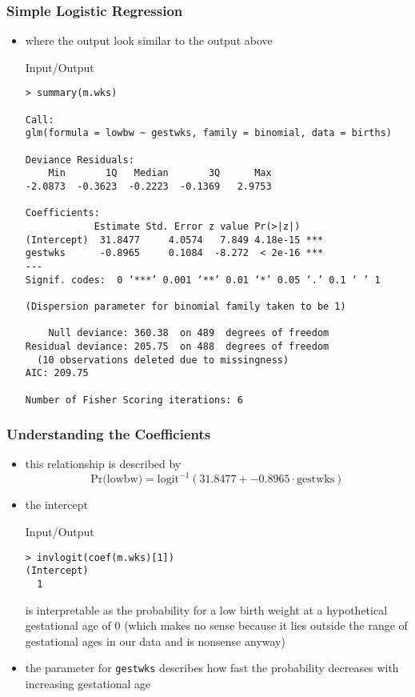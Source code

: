\begin{frame}[fragile]\frametitle{Simple Logistic Regression}
\begin{itemize}
\item where the output look similar to the output above
  \begin{exampleblock}{Input/Output}\scriptsize
\begin{verbatim}
> summary(m.wks)

Call:
glm(formula = lowbw ~ gestwks, family = binomial, data = births)

Deviance Residuals: 
    Min       1Q   Median       3Q      Max  
-2.0873  -0.3623  -0.2223  -0.1369   2.9753  

Coefficients:
            Estimate Std. Error z value Pr(>|z|)    
(Intercept)  31.8477     4.0574   7.849 4.18e-15 ***
gestwks      -0.8965     0.1084  -8.272  < 2e-16 ***
---
Signif. codes:  0 ‘***’ 0.001 ‘**’ 0.01 ‘*’ 0.05 ‘.’ 0.1 ‘ ’ 1

(Dispersion parameter for binomial family taken to be 1)

    Null deviance: 360.38  on 489  degrees of freedom
Residual deviance: 205.75  on 488  degrees of freedom
  (10 observations deleted due to missingness)
AIC: 209.75

Number of Fisher Scoring iterations: 6
\end{verbatim}
  \end{exampleblock}
\end{itemize}
\end{frame}


\begin{frame}[fragile]\frametitle{Understanding the Coefficients}
\begin{itemize}
\item this relationship is described by $$\mbox{Pr(lowbw)}=\mbox{logit}^{-1}(31.8477 + -0.8965 \cdot \mbox{gestwks}) $$
\item the intercept
  \begin{exampleblock}{Input/Output}
\begin{verbatim}
> invlogit(coef(m.wks)[1])
(Intercept) 
  1
\end{verbatim}
  \end{exampleblock}
is interpretable as the probability for a low birth weight at a hypothetical gestational age of 0 (which makes no sense because it lies outside the range of gestational ages in our data and is nonsense anyway)
\item the parameter for \texttt{gestwks} describes how fast the probability decreases with increasing gestational age
\end{itemize}
\end{frame}

